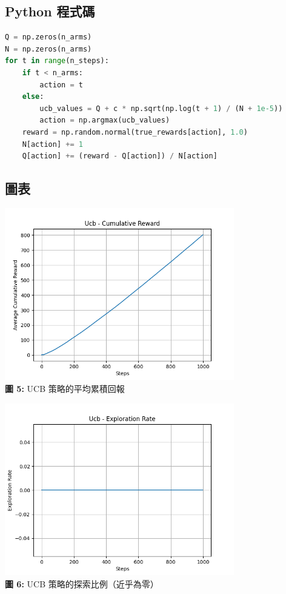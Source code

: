 \documentclass{article}
\begin{document}
\subsection*{Python 程式碼}
\begin{lstlisting}[language=Python]
Q = np.zeros(n_arms)
N = np.zeros(n_arms)
for t in range(n_steps):
    if t < n_arms:
        action = t
    else:
        ucb_values = Q + c * np.sqrt(np.log(t + 1) / (N + 1e-5))
        action = np.argmax(ucb_values)
    reward = np.random.normal(true_rewards[action], 1.0)
    N[action] += 1
    Q[action] += (reward - Q[action]) / N[action]
\end{lstlisting}

\subsection*{圖表}
\begin{center}
\includegraphics[width=0.75\textwidth]{./plots/ucb_reward.png} \\
\textbf{圖 5:} UCB 策略的平均累積回報
\end{center}

\begin{center}
\includegraphics[width=0.75\textwidth]{./plots/ucb_explore.png} \\
\textbf{圖 6:} UCB 策略的探索比例（近乎為零）
\end{center}
\end{document}
